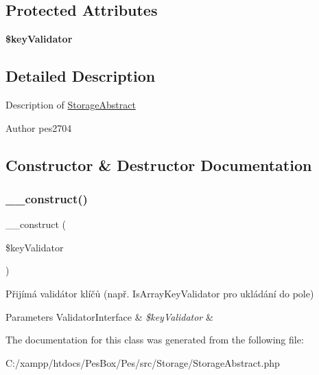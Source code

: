 \subsection*{Protected Attributes}
\begin{DoxyCompactItemize}
\item 
\mbox{\label{class_pes_1_1_storage_1_1_storage_abstract_aaf3a9eb3984964f132f599a8fec2607a}} 
{\bfseries \$key\+Validator}
\end{DoxyCompactItemize}


\subsection{Detailed Description}
Description of \mbox{\hyperlink{class_pes_1_1_storage_1_1_storage_abstract}{Storage\+Abstract}}

\begin{DoxyAuthor}{Author}
pes2704 
\end{DoxyAuthor}


\subsection{Constructor \& Destructor Documentation}
\mbox{\label{class_pes_1_1_storage_1_1_storage_abstract_ab580542037647e014bb7213e732ad5b1}} 
\subsubsection{\texorpdfstring{\+\_\+\+\_\+construct()}{\_\_construct()}}
{\footnotesize\ttfamily \+\_\+\+\_\+construct (\begin{DoxyParamCaption}\item[{\mbox{\hyperlink{interface_pes_1_1_validator_1_1_validator_interface}{Validator\+Interface}}}]{\$key\+Validator }\end{DoxyParamCaption})}

Přijímá validátor klíčů (např. Is\+Array\+Key\+Validator pro ukládání do pole) 
\begin{DoxyParams}[1]{Parameters}
Validator\+Interface & {\em \$key\+Validator} & \\
\hline
\end{DoxyParams}


The documentation for this class was generated from the following file\+:\begin{DoxyCompactItemize}
\item 
C\+:/xampp/htdocs/\+Pes\+Box/\+Pes/src/\+Storage/Storage\+Abstract.\+php\end{DoxyCompactItemize}
